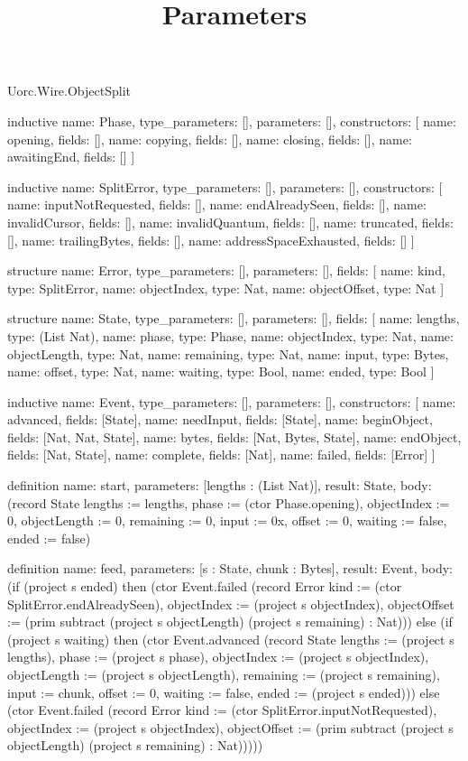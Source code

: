 \begin{lexlean}{Uorc.Wire.ObjectSplit}
\title{Parameters}
\begin{semanticmodule}
inductive{
  name: Phase,
  type_parameters: [],
  parameters: [],
  constructors: [
    {name: opening, fields: []},
    {name: copying, fields: []},
    {name: closing, fields: []},
    {name: awaitingEnd, fields: []}
  ]
}

inductive{
  name: SplitError,
  type_parameters: [],
  parameters: [],
  constructors: [
    {name: inputNotRequested, fields: []},
    {name: endAlreadySeen, fields: []},
    {name: invalidCursor, fields: []},
    {name: invalidQuantum, fields: []},
    {name: truncated, fields: []},
    {name: trailingBytes, fields: []},
    {name: addressSpaceExhausted, fields: []}
  ]
}

structure{
  name: Error,
  type_parameters: [],
  parameters: [],
  fields: [
    {name: kind, type: SplitError},
    {name: objectIndex, type: Nat},
    {name: objectOffset, type: Nat}
  ]
}

structure{
  name: State,
  type_parameters: [],
  parameters: [],
  fields: [
    {name: lengths, type: (List Nat)},
    {name: phase, type: Phase},
    {name: objectIndex, type: Nat},
    {name: objectLength, type: Nat},
    {name: remaining, type: Nat},
    {name: input, type: Bytes},
    {name: offset, type: Nat},
    {name: waiting, type: Bool},
    {name: ended, type: Bool}
  ]
}

inductive{
  name: Event,
  type_parameters: [],
  parameters: [],
  constructors: [
    {name: advanced, fields: [State]},
    {name: needInput, fields: [State]},
    {name: beginObject, fields: [Nat, Nat, State]},
    {name: bytes, fields: [Nat, Bytes, State]},
    {name: endObject, fields: [Nat, State]},
    {name: complete, fields: [Nat]},
    {name: failed, fields: [Error]}
  ]
}

definition{
  name: start,
  parameters: [lengths : (List Nat)],
  result: State,
  body: (record State {lengths := lengths, phase := (ctor Phase.opening), objectIndex := 0, objectLength := 0, remaining := 0, input := 0x, offset := 0, waiting := false, ended := false})
}

definition{
  name: feed,
  parameters: [s : State, chunk : Bytes],
  result: Event,
  body: (if (project s ended) then (ctor Event.failed (record Error {kind := (ctor SplitError.endAlreadySeen), objectIndex := (project s objectIndex), objectOffset := (prim subtract (project s objectLength) (project s remaining) : Nat)})) else (if (project s waiting) then (ctor Event.advanced (record State {lengths := (project s lengths), phase := (project s phase), objectIndex := (project s objectIndex), objectLength := (project s objectLength), remaining := (project s remaining), input := chunk, offset := 0, waiting := false, ended := (project s ended)})) else (ctor Event.failed (record Error {kind := (ctor SplitError.inputNotRequested), objectIndex := (project s objectIndex), objectOffset := (prim subtract (project s objectLength) (project s remaining) : Nat)}))))
}


\end{semanticmodule}
\end{lexlean}
